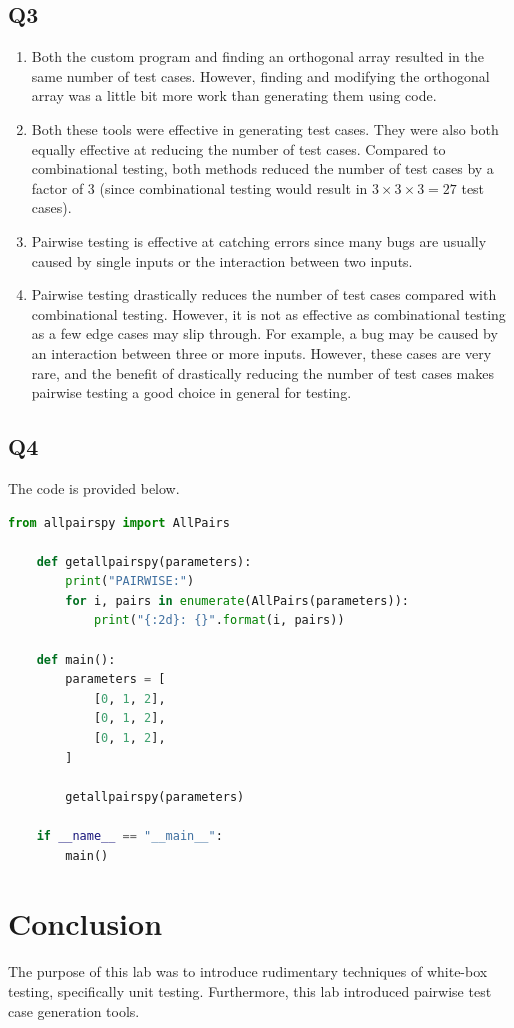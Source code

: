 \documentclass[12pt, letterpaper, titlepage]{article}
\begin{document}
\subsection*{Q3}
\begin{enumerate}
    \item Both the custom program and finding an orthogonal array resulted in the same number of test cases. However, finding and modifying the orthogonal array was a little bit more work than generating them using code. 
    \item Both these tools were effective in generating test cases. They were also both equally effective at reducing the number of test cases. Compared to combinational testing, both methods reduced the number of test cases by a factor of 3 (since combinational testing would result in $3\times3\times3 = 27$ test cases).
    \item Pairwise testing is effective at catching errors since many bugs are usually caused by single inputs or the interaction between two inputs. 
    \item Pairwise testing drastically reduces the number of test cases compared with combinational testing. However, it is not as effective as combinational testing as a few edge cases may slip through. For example, a bug may be caused by an interaction between three or more inputs. However, these cases are very rare, and the benefit of drastically reducing the number of test cases makes pairwise testing a good choice in general for testing.
\end{enumerate}

\subsection*{Q4}
The code is provided below.
\begin{lstlisting}[language=Python, style=code_style]
    from allpairspy import AllPairs

    def getallpairspy(parameters):
        print("PAIRWISE:")
        for i, pairs in enumerate(AllPairs(parameters)):
            print("{:2d}: {}".format(i, pairs))

    def main():
        parameters = [
            [0, 1, 2],
            [0, 1, 2],
            [0, 1, 2],
        ]

        getallpairspy(parameters)

    if __name__ == "__main__":
        main()
\end{lstlisting}

\section*{Conclusion}
The purpose of this lab was to introduce rudimentary techniques of white-box testing, specifically unit testing. Furthermore, this lab introduced pairwise test case generation tools.
\end{document}
